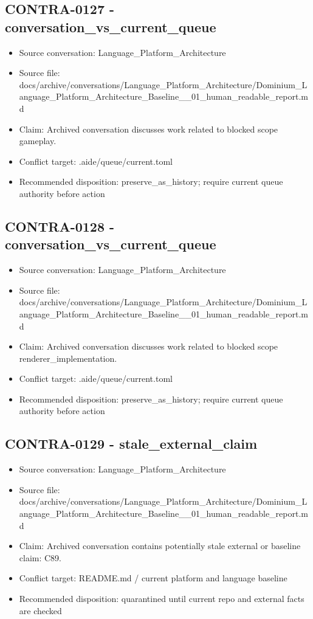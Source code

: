 \documentclass[11pt,a4paper]{report}
\begin{document}
\subsection{CONTRA-0127 - conversation\_vs\_current\_queue}

\begin{itemize}
\item Source conversation: Language\_Platform\_Architecture
\item Source file: docs/archive/conversations/Language\_Platform\_Architecture/Dominium\_Language\_Platform\_Architecture\_Baseline\_\_01\_human\_readable\_report.md
\item Claim: Archived conversation discusses work related to blocked scope gameplay.
\item Conflict target: .aide/queue/current.toml
\item Recommended disposition: preserve\_as\_history; require current queue authority before action
\end{itemize}

\subsection{CONTRA-0128 - conversation\_vs\_current\_queue}

\begin{itemize}
\item Source conversation: Language\_Platform\_Architecture
\item Source file: docs/archive/conversations/Language\_Platform\_Architecture/Dominium\_Language\_Platform\_Architecture\_Baseline\_\_01\_human\_readable\_report.md
\item Claim: Archived conversation discusses work related to blocked scope renderer\_implementation.
\item Conflict target: .aide/queue/current.toml
\item Recommended disposition: preserve\_as\_history; require current queue authority before action
\end{itemize}

\subsection{CONTRA-0129 - stale\_external\_claim}

\begin{itemize}
\item Source conversation: Language\_Platform\_Architecture
\item Source file: docs/archive/conversations/Language\_Platform\_Architecture/Dominium\_Language\_Platform\_Architecture\_Baseline\_\_01\_human\_readable\_report.md
\item Claim: Archived conversation contains potentially stale external or baseline claim: C89.
\item Conflict target: README.md / current platform and language baseline
\item Recommended disposition: quarantined until current repo and external facts are checked
\end{itemize}
\end{document}
